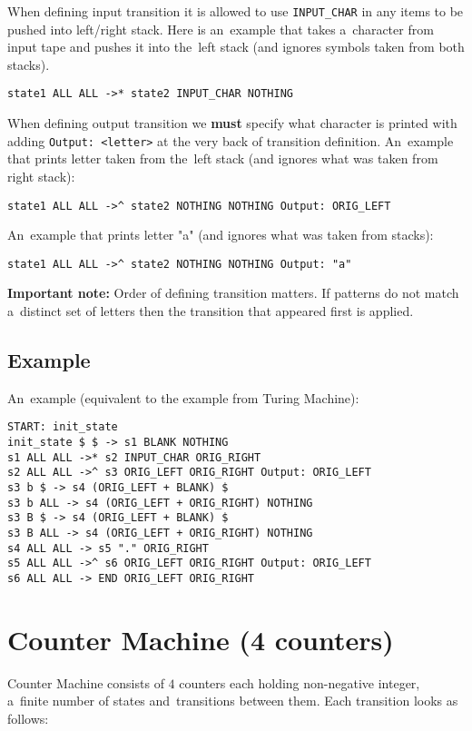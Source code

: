 \documentclass[english,shortabstract,mgr]{iithesis}
\begin{document}
When defining input transition it is allowed to use \texttt{INPUT\_CHAR} in any items
to be pushed into left/right stack. Here is an~example that takes a~character from input
tape and pushes it into the~left stack (and ignores symbols taken from both stacks).
\begin{verbatim}
state1 ALL ALL ->* state2 INPUT_CHAR NOTHING
\end{verbatim}

When defining output transition we \textbf{must} specify what character is printed
with adding \texttt{Output: <letter>} at the very back of transition definition.
An~example that prints letter taken from the~left stack (and ignores what was taken from right stack):
\begin{verbatim}
state1 ALL ALL ->^ state2 NOTHING NOTHING Output: ORIG_LEFT
\end{verbatim}
An~example that prints letter "a" (and ignores what was taken from stacks):
\begin{verbatim}
state1 ALL ALL ->^ state2 NOTHING NOTHING Output: "a"
\end{verbatim}

\textbf{Important note:} Order of defining transition matters. If patterns do not match
a~distinct set of letters then the transition that appeared first is applied.

\subsection{Example}

An~example (equivalent to the example from Turing Machine):
\begin{verbatim}
START: init_state
init_state $ $ -> s1 BLANK NOTHING
s1 ALL ALL ->* s2 INPUT_CHAR ORIG_RIGHT
s2 ALL ALL ->^ s3 ORIG_LEFT ORIG_RIGHT Output: ORIG_LEFT
s3 b $ -> s4 (ORIG_LEFT + BLANK) $
s3 b ALL -> s4 (ORIG_LEFT + ORIG_RIGHT) NOTHING
s3 B $ -> s4 (ORIG_LEFT + BLANK) $
s3 B ALL -> s4 (ORIG_LEFT + ORIG_RIGHT) NOTHING
s4 ALL ALL -> s5 "." ORIG_RIGHT
s5 ALL ALL ->^ s6 ORIG_LEFT ORIG_RIGHT Output: ORIG_LEFT
s6 ALL ALL -> END ORIG_LEFT ORIG_RIGHT
\end{verbatim}

\section {Counter Machine (4 counters)}

Counter Machine consists of $4$ counters each holding non-negative integer,
a~finite number of states and~transitions between them. Each transition
looks as follows:
\end{document}
